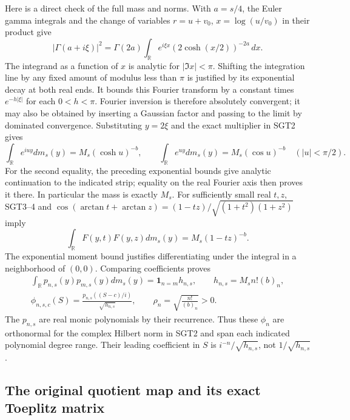 \documentclass[11pt,a4paper]{article}
\begin{document}
Here is a direct check of the full mass and norms. With $a=s/4$,
the Euler gamma integrals and the change of variables
$r=u+v_0$, $x=\log(u/v_0)$ in their product give
\[
 |\Gamma(a+i\xi)|^2
 =\Gamma(2a)\int_{\mathbb R}e^{i\xi x}
                    (2\cosh(x/2))^{-2a}\,dx .
\]
The integrand as a function of $x$ is analytic for $|\Im x|<\pi$.
Shifting the integration line by any fixed amount of modulus less than
$\pi$ is justified by its exponential decay at both real ends.
It bounds this Fourier transform by a constant times
$e^{-h|\xi|}$ for each $0<h<\pi$. Fourier inversion is therefore
absolutely convergent; it may also be obtained by inserting a Gaussian
factor and passing to the limit by dominated convergence. Substituting
$y=2\xi$ and the exact multiplier in SGT2 gives
\[
 \int_{\mathbb R}e^{iuy}dm_s(y)=M_s(\cosh u)^{-b},
 \qquad
 \int_{\mathbb R}e^{uy}dm_s(y)=M_s(\cos u)^{-b}
 \quad(|u|<\pi/2).
 \tag{SGT4}
\]
For the second equality, the preceding exponential bounds give analytic
continuation to the indicated strip; equality on the real Fourier axis
then proves it there. In particular the mass is exactly $M_s$.
For sufficiently small real $t,z$, SGT3--4 and
$\cos(\arctan t+\arctan z)
 =(1-tz)/\sqrt{(1+t^2)(1+z^2)}$ imply
\[
 \int_{\mathbb R}F(y,t)F(y,z)dm_s(y)=M_s(1-tz)^{-b}.
\]
The exponential moment bound justifies differentiating under the
integral in a neighborhood of $(0,0)$. Comparing coefficients proves
\[
\begin{gathered}
 \int_{\mathbb R}p_{n,s}(y)p_{m,s}(y)dm_s(y)
       =\mathbf1_{n=m}h_{n,s},\qquad
 h_{n,s}=M_sn!(b)_n,\\
 \phi_{n,s,c}(S)=
       \frac{p_{n,s}((S-c)/i)}{\sqrt{h_{n,s}}},\qquad
 \rho_n=\sqrt{\frac{n!}{(b)_n}}>0 .
\end{gathered}\tag{SGT5}
\]
The $p_{n,s}$ are real monic polynomials by their recurrence. Thus these
$\phi_n$ are orthonormal for the complex Hilbert norm in SGT2 and span
each indicated polynomial degree range. Their leading coefficient in
$S$ is $i^{-n}/\sqrt{h_{n,s}}$, not $1/\sqrt{h_{n,s}}$.

\subsection{The original quotient map and its exact Toeplitz matrix}
\end{document}
